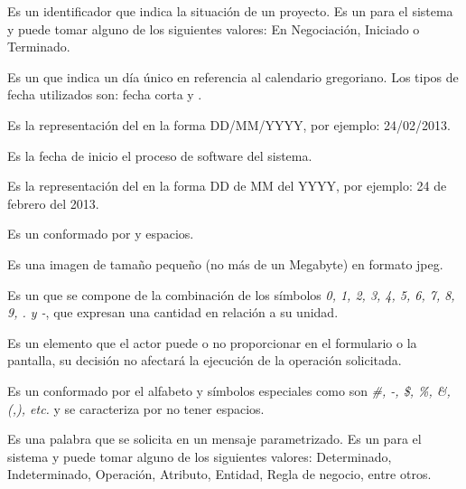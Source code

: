 \begin{description}
	 Es un identificador que indica la situación de un proyecto. Es un  para el sistema y puede tomar alguno de los siguientes valores:
	En Negociación, Iniciado o Terminado.

	 Es un  que indica un día único en referencia al calendario gregoriano. Los tipos de fecha utilizados son: 
	{fecha corta} y . %

	 Es la representación del   en la forma DD/MM/YYYY, por ejemplo: 24/02/2013.
	
	 Es la fecha de inicio el proceso de software del sistema.

	 Es la representación del   en la forma DD de MM del YYYY, por ejemplo: 24 de febrero del 2013.

	 Es un  conformado por  y espacios.
	
	 Es una imagen de tamaño pequeño (no más de un Megabyte) en formato jpeg.
	
	 Es un  que se compone de la combinación de los símbolos \textit{0, 1, 2, 3, 4, 5, 6, 7, 8, 9, . y -},  que expresan una cantidad 
	en relación a su unidad.
	
	 Es un elemento que el actor puede o no proporcionar en el formulario o la pantalla, su decisión no afectará la ejecución de la operación solicitada.

	 Es un   conformado por el alfabeto y símbolos especiales como son 
	\textit{\#, -, \$, \%, \&, (,), etc.} y se caracteriza por no tener espacios.
	
	 Es una palabra que se solicita en un mensaje parametrizado. Es un  para el sistema y puede tomar alguno de los siguientes valores:
	Determinado, Indeterminado, Operación, Atributo, Entidad, Regla de negocio, entre otros.
	

\end{description}
